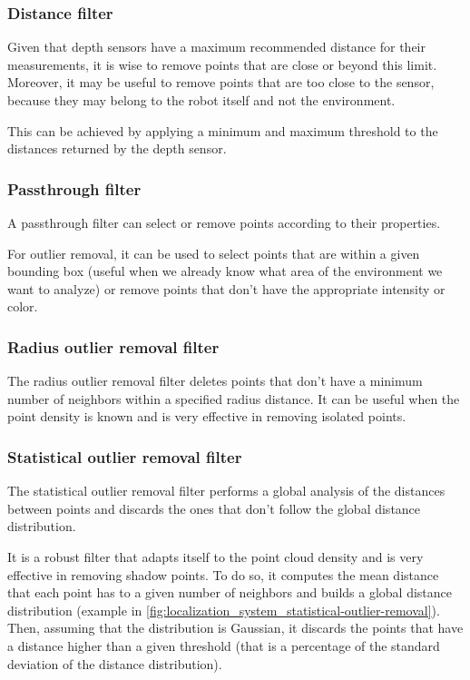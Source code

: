 \subsubsection{Distance filter}

Given that depth sensors have a maximum recommended distance for their measurements, it is wise to remove points that are close or beyond this limit. Moreover, it may be useful to remove points that are too close to the sensor, because they may belong to the robot itself and not the environment.

This can be achieved by applying a minimum and maximum threshold to the distances returned by the depth sensor.


\subsubsection{Passthrough filter}

A passthrough filter can select or remove points according to their properties.

For outlier removal, it can be used to select points that are within a given bounding box (useful when we already know what area of the environment we want to analyze) or remove points that don't have the appropriate intensity or color.


\subsubsection{Radius outlier removal filter}

The radius outlier removal filter deletes points that don't have a minimum number of neighbors within a specified radius distance. It can be useful when the point density is known and is very effective in removing isolated points.


\subsubsection{Statistical outlier removal filter}

The statistical outlier removal filter \cite{Rusu2010a} performs a global analysis of the distances between points and discards the ones that don't follow the global distance distribution.

It is a robust filter that adapts itself to the point cloud density and is very effective in removing shadow points. To do so, it computes the mean distance that each point has to a given number of neighbors and builds a global distance distribution (example in \cref{fig:localization_system_statistical-outlier-removal}). Then, assuming that the distribution is Gaussian, it discards the points that have a distance higher than a given threshold (that is a percentage of the standard deviation of the distance distribution).

